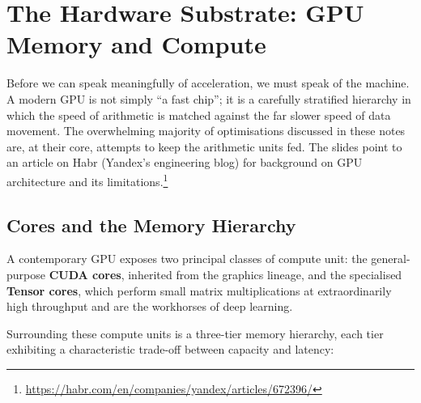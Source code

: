\documentclass[11pt,a4paper]{article}
\theoremstyle{definition}
\theoremstyle{remark}
\theoremstyle{plain}
\begin{document}
\section{The Hardware Substrate: GPU Memory and Compute}
\label{sec:hardware}

Before we can speak meaningfully of acceleration, we must speak of the
machine. A modern GPU is not simply ``a fast chip''; it is a carefully
stratified hierarchy in which the speed of arithmetic is matched against
the far slower speed of data movement. The overwhelming majority of
optimisations discussed in these notes are, at their core, attempts to
keep the arithmetic units fed. The slides point to an article on Habr
(Yandex's engineering blog) for background on GPU architecture and its
limitations.\footnote{\url{https://habr.com/en/companies/yandex/articles/672396/}}

\subsection{Cores and the Memory Hierarchy}

A contemporary GPU exposes two principal classes of compute unit: the
general-purpose \textbf{CUDA cores}, inherited from the graphics lineage,
and the specialised \textbf{Tensor cores}, which perform small matrix
multiplications at extraordinarily high throughput and are the workhorses
of deep learning.

Surrounding these compute units is a three-tier memory hierarchy, each
tier exhibiting a characteristic trade-off between capacity and latency:

\begin{center}
\end{center}
\end{document}

